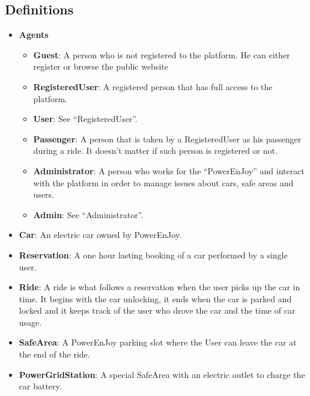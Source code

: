 \subsection{Definitions}
    \begin{itemize}
        \item \textbf{Agents}
        \begin{itemize}
            \item \textbf{Guest}: A person who is not registered to the platform. He can either
                register or browse the public website
            \item \textbf{RegisteredUser}: A registered person that has full access to the platform.
            \item \textbf{User}: See ``RegisteredUser''.
            \item \textbf{Passenger}: A person that is taken by a RegisteredUser as his passenger during a ride. It doesn't matter if such person is registered or not.
            \item \textbf{Administrator}: A person who works for the ``PowerEnJoy'' and interact with the platform in order to manage issues about cars, safe areas and users.
            \item \textbf{Admin}: See ``Administrator''.
        \end{itemize}
        \item \textbf{Car}: An electric car owned by PowerEnJoy.		
        \item \textbf{Reservation}: A one hour lasting booking of a car performed by a 
            single user.
        \item \textbf{Ride}: A ride is what follows a reservation when the user picks up the
            car in time. It begins with the car unlocking, it ends when the car is parked and
            locked and it keeps track of the user who drove the car and the time of car usage.
        \item \textbf{SafeArea}: A PowerEnJoy parking slot where the User can leave the car
            at the end of the ride.
        \item \textbf{PowerGridStation}: A special SafeArea with an electric outlet to charge
            the car battery.
    \end{itemize}
